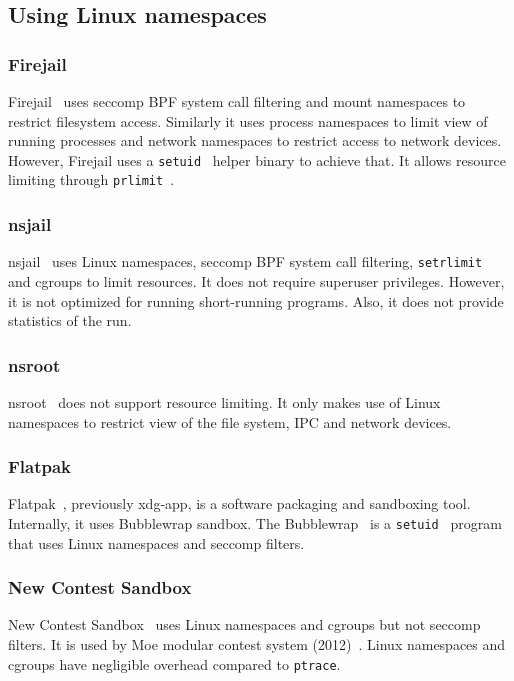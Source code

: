 \documentclass[en]{pracamgr}
\begin{document}
\subsection{Using Linux namespaces}

\subsubsection{Firejail}
Firejail~\cite{netblue30/firejail} uses seccomp BPF system call filtering and mount namespaces to restrict filesystem access. Similarly it uses process namespaces to limit view of running processes and network namespaces to restrict access to network devices. However, Firejail uses a \texttt{setuid}~\cite{man_setuid} helper binary to achieve that. It allows resource limiting through \texttt{prlimit}~\cite{man_getrlimit_setrlimit_prlimit}.

\subsubsection{nsjail} \label{subsubsection:nsjail}
nsjail~\cite{google/nsjail} uses Linux namespaces, seccomp BPF system call filtering, \texttt{setrlimit}~\cite{man_getrlimit_setrlimit_prlimit} and cgroups to limit resources. It does not require superuser privileges. However, it is not optimized for running short-running programs. Also, it does not provide statistics of the run.

\subsubsection{nsroot}
nsroot~\cite{raknes2016nsroot} does not support resource limiting. It only makes use of Linux namespaces to restrict view of the file system, IPC and network devices.

\subsubsection{Flatpak}
Flatpak~\cite{flatpak}, previously xdg-app, is a software packaging and sandboxing tool. Internally, it uses Bubblewrap sandbox. The Bubblewrap~\cite{bubblewrap} is a \texttt{setuid}~\cite{man_setuid} program that uses Linux namespaces and seccomp filters.

\subsubsection{New Contest Sandbox}
New Contest Sandbox~\cite{marevs2012new} uses Linux namespaces and cgroups but not seccomp filters. It is used by Moe modular contest system (2012)~\cite{marevs2012new}. Linux namespaces and cgroups have negligible overhead compared to \texttt{ptrace}.
\end{document}
